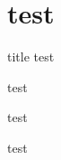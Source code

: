 \documentclass{beamer}
\begin{document}
\section{test}

\begin{frame}{title}
test
\end{frame}

\begin{frame}
test
\end{frame}

\begin{frame}
test
\end{frame}

\begin{frame}
test
\end{frame}
\end{document}
